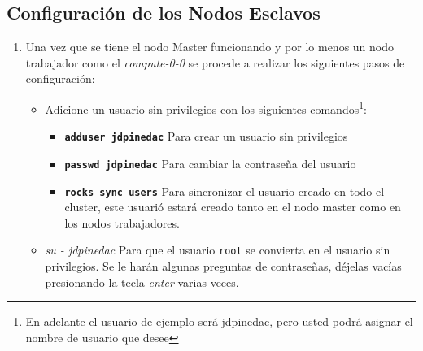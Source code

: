 \documentclass[12pt]{article}
\begin{document}
\subsection{Configuración de los Nodos Esclavos}
\begin{enumerate}
\item Una vez que se tiene el nodo Master funcionando y por lo menos un nodo trabajador como el \textit{compute-0-0} se procede a realizar los siguientes pasos de configuración:
\begin{itemize}
\item Adicione un usuario sin privilegios con los siguientes comandos\footnote{En adelante el usuario de ejemplo será jdpinedac, pero usted podrá asignar el nombre de usuario que desee}:
  \begin{itemize}
  \item \textbf{\texttt{adduser jdpinedac}} Para crear un usuario sin privilegios
  \item \textbf{\texttt{passwd jdpinedac}} Para cambiar la contraseña del usuario
  \item \textbf{\texttt{rocks sync users}} Para sincronizar el usuario creado en todo el cluster, este usuarió estará creado tanto en el nodo master como en los nodos trabajadores.
  \end{itemize}
\item \textit{su - jdpinedac} Para que el usuario \texttt{root} se convierta en el usuario sin privilegios. Se le harán algunas preguntas de contraseñas, déjelas vacías presionando la tecla \textit{enter} varias veces.
\end{itemize}
\end{enumerate}
\end{document}
